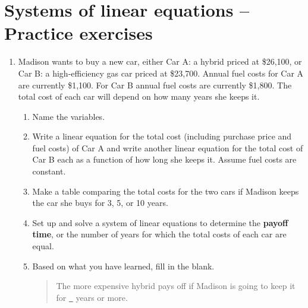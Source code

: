 
\section{Systems of linear equations -- Practice exercises}

\begin{enumerate}
\item Madison wants to buy a new car, either Car A:  a hybrid priced at \$26,100, or Car B: a high-efficiency gas car priced at \$23,700.  Annual fuel costs for Car A are currently \$1,100.  For Car B annual fuel costs are currently \$1,800.  The total cost of each car will depend on how many years she keeps it. 
\begin{enumerate}
\item Name the variables. \vfill
\item Write a linear equation for the total cost (including purchase price and fuel costs) of Car A and write another linear equation for the total cost of Car B each as a function of how long she keeps it.  Assume fuel costs are constant. \vfill
\item Make a table comparing the total costs for the two cars if Madison keeps the car she buys for 3, 5, or 10 years. \vfill
\item Set up and solve a system of linear equations to determine the \textbf{payoff time}, or the number of years for which the total costs of each car are equal. \vfill \vfill
\item Based on what you have learned, fill in the blank.
\begin{quote}
The more expensive hybrid pays off if Madison is going to keep it for \underline{\quad~} years or more.  
\end{quote}
\end{enumerate}

\newpage %


\end{enumerate}
